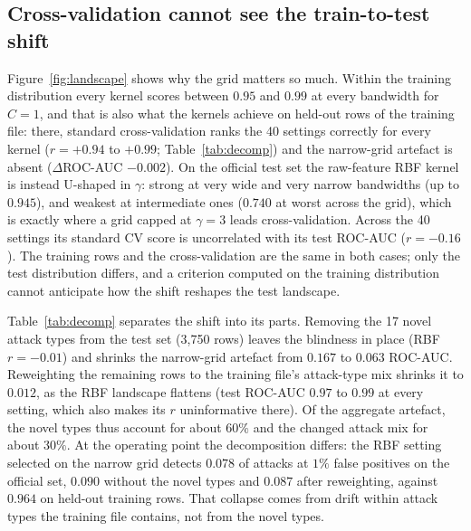 \documentclass[preprint,11pt]{elsarticle}
\begin{document}
\subsection{Cross-validation cannot see the train-to-test shift}\label{sec:kcv}
Figure~\ref{fig:landscape} shows why the grid matters so much. Within the training distribution every
kernel scores between $0.95$ and $0.99$ at every bandwidth for $C=1$, and that is also what the kernels
achieve on held-out rows of the training file: there, standard cross-validation ranks the 40 settings
correctly for every kernel ($r=+0.94$ to $+0.99$; Table~\ref{tab:decomp}) and the narrow-grid artefact is
absent ($\Delta$ROC-AUC $-0.002$). On the official test set the raw-feature RBF kernel is instead U-shaped
in $\gamma$: strong at very wide and very narrow bandwidths (up to $0.945$), and weakest at intermediate
ones ($0.740$ at worst across the grid), which is exactly where a grid capped at $\gamma=3$ leads
cross-validation. Across the 40 settings its standard CV score is uncorrelated with its test ROC-AUC
($r=-0.16$). The training rows and the cross-validation are the same in both cases; only the test
distribution differs, and a criterion computed on the training distribution cannot anticipate how the
shift reshapes the test landscape.

Table~\ref{tab:decomp} separates the shift into its parts. Removing the 17 novel attack types from the
test set (3{,}750 rows) leaves the blindness in place (RBF $r=-0.01$) and shrinks the narrow-grid
artefact from $0.167$ to $0.063$ ROC-AUC. Reweighting the remaining rows to the training file's
attack-type mix shrinks it to $0.012$, as the RBF landscape flattens (test ROC-AUC $0.97$ to $0.99$ at
every setting, which also makes its $r$ uninformative there). Of the aggregate artefact, the novel types
thus account for about $60\%$ and the changed attack mix for about $30\%$. At the operating point the
decomposition differs: the RBF setting selected on the narrow grid detects $0.078$ of attacks at $1\%$
false positives on the official set, $0.090$ without the novel types and $0.087$ after reweighting,
against $0.964$ on held-out training rows. That collapse comes from drift within attack types the
training file contains, not from the novel types.
\end{document}
